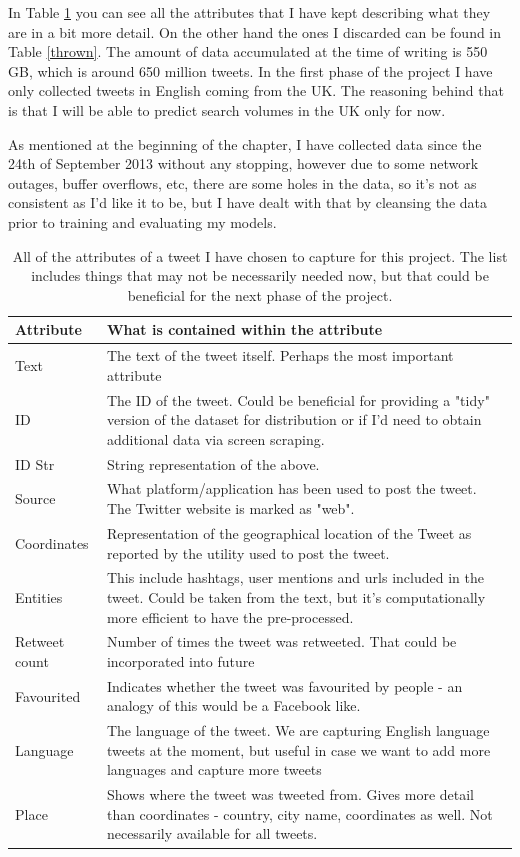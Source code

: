 \documentclass[minf,twoside,singlespacing,parskip,frontabs,notimes,11pt]{infthesis}
\begin{document}
In Table \ref{kept} you can see all the attributes that I have kept describing what they are in a bit more detail. On the other hand the ones I discarded can be found in Table \ref{thrown}. The amount of data accumulated at the time of writing is 550 GB, which is around 650 million tweets. In the first phase of the project I have only collected tweets in English coming from the UK. The reasoning behind that is that I will be able to predict search volumes in the UK only for now.


As mentioned at the beginning of the chapter, I have collected data since the 24th of September 2013 without any stopping, however due to some network outages, buffer overflows, etc, there are some holes in the data, so it's not as consistent as I'd like it to be, but I have dealt with that by cleansing the data prior to training and evaluating my models. 


\begin{table}[]
\begin{center}
\begin{tabular}{ l | p{11cm} }
\textbf{Attribute} & \textbf{What is contained within the attribute} \\
\hline
\hline
Text & The text of the tweet itself. Perhaps the most important attribute \\
\hline
ID & The ID of the tweet. Could be beneficial for providing a "tidy" version of the dataset for distribution or if I'd need to obtain additional data via screen scraping. \\
\hline
ID Str & String representation of the above. \\
\hline
Source & What platform/application has been used to post the tweet. The Twitter website is marked as "web". \\
\hline
Coordinates  & Representation of the geographical location of the Tweet as reported by the utility used to post the tweet. \\
\hline
Entities & This include hashtags, user mentions and urls included in the tweet. Could be taken from the text, but it's computationally more efficient to have the pre-processed. \\
\hline
Retweet count & Number of times the tweet was retweeted. That could be incorporated into future \\
\hline
Favourited & Indicates whether the tweet was favourited by people - an analogy of this would be a Facebook like.  \\
\hline
Language & The language of the tweet. We are capturing English language tweets at the moment, but useful in case we want to add more languages and capture more tweets\\
\hline
Place &  Shows where the tweet was tweeted from. Gives more detail than coordinates - country, city name, coordinates as well. Not necessarily available for all tweets. \\
\end{tabular}
\end{center}
\caption{All of the attributes of a tweet I have chosen to capture for this project. The list includes things that may not be necessarily needed now, but that could be beneficial for the next phase of the project. }
\label{kept}
\end{table}
\end{document}
